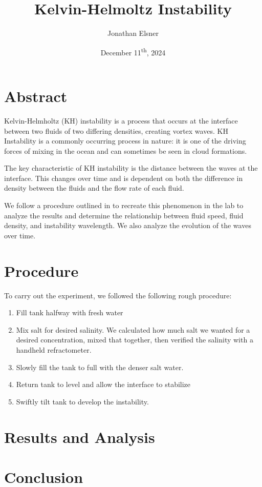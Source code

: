 \documentclass{article}
\title{Kelvin-Helmoltz Instability}
\author{Jonathan Elsner}
\date{December 11\textsuperscript{th}, 2024}
\begin{document}
\maketitle

\section{Abstract}

Kelvin-Helmholtz (KH) instability is a process that occurs at the interface
between two fluids of two differing densities, creating vortex waves. KH
Instability is a commonly occurring process in nature: it is one of the driving
forces of mixing in the ocean %
and can sometimes be seen in cloud formations. %

The key characteristic of KH instability is the distance between the waves at
the interface. This changes over time and is dependent on both the difference in
density between the fluids and the flow rate of each fluid.

We follow a procedure outlined in \cite{kh-instability-demo} to recreate this
phenomenon in the lab to analyze the results and determine the relationship
between fluid speed, fluid density, and instability wavelength. We also analyze
the evolution of the waves over time.

\section{Procedure}

To carry out the experiment, we followed the following rough procedure:

\begin{enumerate}
    \item Fill tank halfway with fresh water
    \item Mix salt for desired salinity. We calculated how much salt we wanted
    for a desired concentration, mixed that together, then verified the salinity
    with a handheld refractometer.
    \item Slowly fill the tank to full with the denser salt water.
    \item Return tank to level and allow the interface to stabilize
    \item Swiftly tilt tank to develop the instability.
\end{enumerate}

\section{Results and Analysis}

\section{Conclusion}

{}

\end{document}
